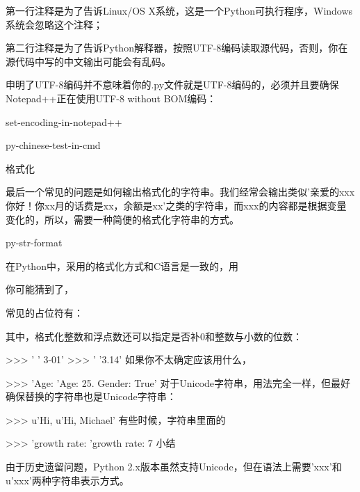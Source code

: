 第一行注释是为了告诉Linux/OS X系统，这是一个Python可执行程序，Windows系统会忽略这个注释；

第二行注释是为了告诉Python解释器，按照UTF-8编码读取源代码，否则，你在源代码中写的中文输出可能会有乱码。


申明了UTF-8编码并不意味着你的.py文件就是UTF-8编码的，必须并且要确保Notepad++正在使用UTF-8 without BOM编码：

set-encoding-in-notepad++


py-chinese-test-in-cmd

格式化

最后一个常见的问题是如何输出格式化的字符串。我们经常会输出类似'亲爱的xxx你好！你xx月的话费是xx，余额是xx'之类的字符串，而xxx的内容都是根据变量变化的，所以，需要一种简便的格式化字符串的方式。

py-str-format

在Python中，采用的格式化方式和C语言是一致的，用%

你可能猜到了，%

常见的占位符有：

其中，格式化整数和浮点数还可以指定是否补0和整数与小数的位数：

>>> '%
' 3-01'
>>> '%
'3.14'
如果你不太确定应该用什么，%

>>> 'Age: %
'Age: 25. Gender: True'
对于Unicode字符串，用法完全一样，但最好确保替换的字符串也是Unicode字符串：

>>> u'Hi, %
u'Hi, Michael'
有些时候，字符串里面的%

>>> 'growth rate: %
'growth rate: 7 %
小结

由于历史遗留问题，Python 2.x版本虽然支持Unicode，但在语法上需要'xxx'和u'xxx'两种字符串表示方式。

